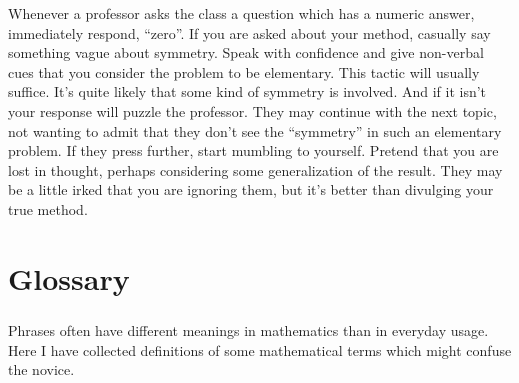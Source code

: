 Whenever a professor asks the class a question which has a numeric answer,
immediately respond, ``zero''.  If you are asked about your method, casually
say something vague about symmetry.  Speak with confidence and give 
non-verbal cues that you consider the problem to be elementary.
This tactic will usually suffice.  It's quite likely that some kind of 
symmetry is involved.  And if it isn't your response will puzzle the professor.
They may continue with the next topic, not wanting to admit that they
don't see the ``symmetry'' in such an elementary problem.  If they press
further, start mumbling to yourself.  Pretend that you are lost in thought,
perhaps considering some generalization of the result.   They may be a 
little irked that you are ignoring them, but it's better than divulging
your true method.













\raggedbottom
\chapter{Glossary}
\flushbottom


\paragraph{}
Phrases often have different meanings in mathematics than in everyday usage.
Here I have collected definitions of some mathematical terms which might
confuse the novice.


